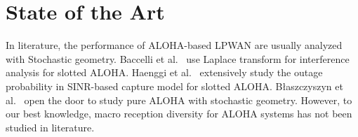 \section{State of the Art
}
In literature, the performance of ALOHA-based LPWAN are usually analyzed with Stochastic geometry. Baccelli et al.~\cite{baccelli2006aloha} use Laplace transform for interference analysis for slotted ALOHA. Haenggi et al.~\cite{haenggi2009interference} extensively study the outage probability in SINR-based capture model for slotted ALOHA. B{\l}aszczyszyn et al.~\cite{blaszczyszyn2010stochastic} open the door to study pure ALOHA with stochastic geometry. However, to our best knowledge, macro reception diversity for ALOHA systems has not been studied in literature.